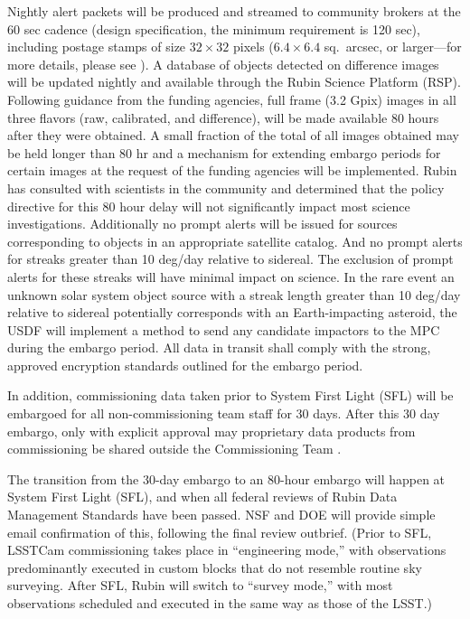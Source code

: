Nightly alert packets will be produced and streamed to community brokers at the 60 sec cadence (design specification, the minimum requirement is 120 sec), including postage stamps of size $32 \times 32$ pixels ($6.4 \times 6.4$ sq.\ \gls{arcsec}, or larger---for more details, please see ).
A database of objects detected on difference images will be updated nightly and available through the Rubin Science Platform (\gls{RSP}).
Following guidance from the funding agencies, full frame (3.2 Gpix) images in all three flavors (raw, calibrated, and difference), will be made available 80 hours after they were obtained.
A small fraction of the total of all images obtained may be held longer than 80 hr and a mechanism for extending embargo periods for certain images at the request of the funding agencies will be implemented.
Rubin has consulted with scientists in the community and determined that the policy directive for this 80 hour delay will not significantly impact most science investigations.
Additionally no prompt alerts will be issued for sources corresponding to objects in an appropriate satellite catalog.
And no prompt alerts for streaks greater than 10 \gls{deg}/day relative to sidereal.
The exclusion of prompt alerts for these streaks will have minimal impact on science.
In the rare event an unknown solar system object source with a streak length greater than 10 \gls{deg}/day relative to sidereal potentially corresponds with an Earth-impacting asteroid, the \gls{USDF} will implement a method to send any candidate impactors to the \gls{MPC} during the embargo period.
All data in transit shall comply with the strong, approved encryption standards outlined for the embargo period.

In addition, commissioning data taken prior to System First Light (SFL) will be embargoed for all non-commissioning team staff for 30 days.
After this 30 day embargo, only with explicit approval may proprietary data products from commissioning be shared outside the \gls{Commissioning} Team  .

The transition from the 30-day embargo to an 80-hour embargo will happen at System First Light (SFL), and when all federal reviews of Rubin Data Management Standards have been passed. 
NSF and DOE will provide simple email confirmation of this, following the final review outbrief.
(Prior to SFL, LSSTCam commissioning takes place in ``engineering mode,'' with observations predominantly executed in custom blocks that do not resemble routine sky surveying. 
After SFL, Rubin will switch to ``survey mode,'' with most observations scheduled and executed in the same way as those of the LSST.)  

